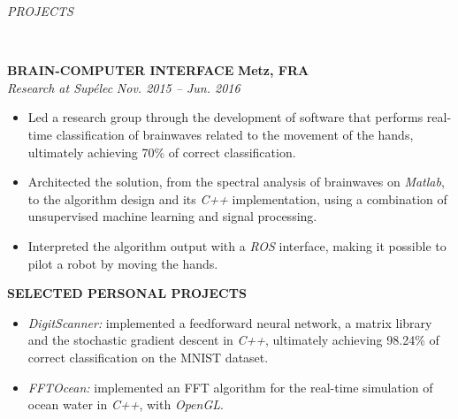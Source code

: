 \documentclass[a4paper, 12pt]{article}
\newcommand{\marginline}{-0.3cm}
\newcommand{\margincontent}{-0.6cm}
\newcommand{\marginbeforesection}{0.3cm}
\newcommand{\linewidthperso}{0.02cm}
\newcommand{\stylesection}[1]{
  \vspace{\marginbeforesection}
  \begin{normalsize}\textit{#1}\end{normalsize}
  \vspace{\marginline}\\
  \noindent\makebox[\linewidth]{\rule{\textwidth}{\linewidthperso}}

}
\newcommand{\styletitle}[1]{\textbf{#1}}
\newcommand{\styledesc}[1]{\textit{#1}}
\newcommand{\styleloc}[1]{\textbf{#1}}
\newcommand{\styledates}[1]{\textit{#1}}
\begin{document}
\begin{footnotesize}

\stylesection{PROJECTS}
   
\styletitle{BRAIN-COMPUTER INTERFACE} \hfill \styleloc{Metz, FRA}\\
\styledesc{Research at Sup\'elec} \hfill \styledates{Nov. 2015 -- Jun. 2016}\\
\vspace{\margincontent}
\begin{itemize}
  \item Led a research group through the development of software that performs real-time classification of brainwaves related to the movement of the hands, ultimately achieving 70\% of correct classification.
  \item Architected the solution, from the spectral analysis of brainwaves on \textit{Matlab}, to the algorithm design and its \textit{C++} implementation, using a combination of unsupervised machine learning and signal processing.
  \item Interpreted the algorithm output with a \textit{ROS} interface, making it possible to pilot a robot by moving the hands.
\end{itemize}

\styletitle{SELECTED PERSONAL PROJECTS}\\
\vspace{\margincontent}
\begin{itemize}
  \item \textit{DigitScanner:} implemented a feedforward neural network, a matrix library and the stochastic gradient descent in \textit{C++}, ultimately achieving 98.24\% of correct classification on the MNIST dataset.
  \item \textit{FFTOcean:} implemented an FFT algorithm for the real-time simulation of ocean water in \textit{C++}, with \textit{OpenGL}.
\end{itemize}


\end{footnotesize}
\end{document}
